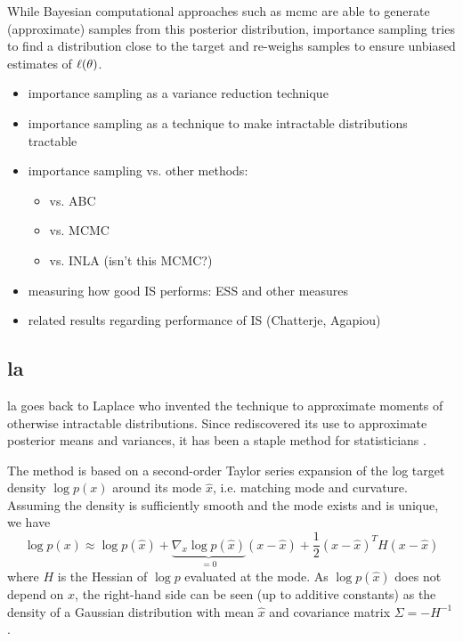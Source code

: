 While Bayesian computational approaches such as \gls{mcmc}\cite{Brooks2011Handbook} are able to generate (approximate) samples from this posterior distribution, importance sampling tries to find a distribution close to the target and re-weighs samples to ensure unbiased estimates of $\ell(\theta)$.

\begin{itemize}
    \item importance sampling as a variance reduction technique
    \item importance sampling as a technique to make intractable distributions tractable
    \item importance sampling vs. other methods:
          \begin{itemize}
              \item vs. ABC
              \item vs. MCMC
              \item vs. INLA (isn't this MCMC?)
          \end{itemize}
    \item measuring how good IS performs: ESS and other measures
    \item related results regarding performance of IS (Chatterje, Agapiou)
\end{itemize}

\subsection{\texorpdfstring{\Acrfull{la}}{Laplace approximation}}

\acrfull{la} goes back to Laplace \cite{Laplace1986Memoir} who invented the technique to approximate moments of otherwise intractable distributions. Since \cite{Tierney1986Accurate,Tierney1989Fully} rediscovered its use to approximate posterior means and variances, it has been a staple method for statisticians .

The method is based on a second-order Taylor series expansion of the log target density $\log p(x)$ around its mode $\hat x$, i.e. matching mode and curvature. Assuming the density is sufficiently smooth and the mode exists and is unique, we have
$$
\log p(x) \approx \log p(\hat x) + \underbrace{\nabla_{x} \log p (\hat x)}_{= 0} \left( x - \hat x \right) + \frac{1}{2} (x - \hat x)^{T} H (x - \hat x)
$$
where $H$ is the Hessian of $\log p$ evaluated at the mode. As $\log p (\hat x)$ does not depend on $x$, the right-hand side can be seen (up to additive constants) as the density of a Gaussian distribution with mean $\hat x$ and covariance matrix $\Sigma = - H^{-1}$. 

